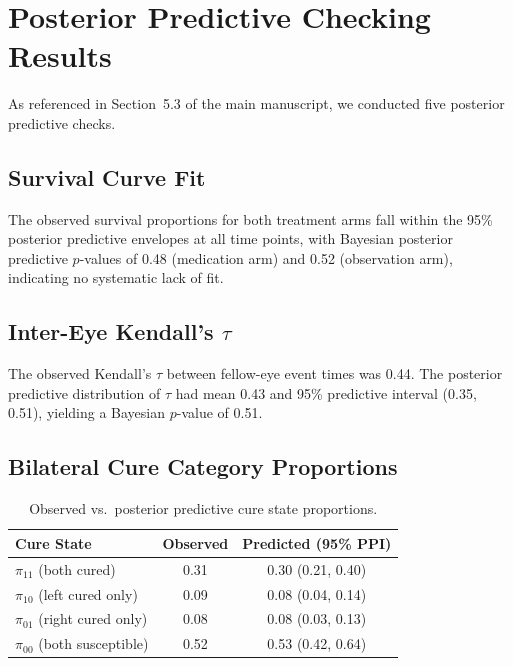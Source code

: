 \documentclass[12pt,a4paper]{article}
\begin{document}
\section{Posterior Predictive Checking Results}
\label{sec:S11}

As referenced in Section~5.3 of the main manuscript, we conducted five posterior predictive checks.

\subsection{Survival Curve Fit}

The observed survival proportions for both treatment arms fall within the 95\% posterior predictive envelopes at all time points, with Bayesian posterior predictive $p$-values of 0.48 (medication arm) and 0.52 (observation arm), indicating no systematic lack of fit.

\subsection{Inter-Eye Kendall's $\tau$}

The observed Kendall's $\tau$ between fellow-eye event times was 0.44. The posterior predictive distribution of $\tau$ had mean 0.43 and 95\% predictive interval (0.35, 0.51), yielding a Bayesian $p$-value of 0.51.

\subsection{Bilateral Cure Category Proportions}

\begin{table}[H]
\centering
\caption{Observed vs.\ posterior predictive cure state proportions.}
\label{tab:S11}
\begin{tabular}{lcc}
\toprule
\textbf{Cure State} & \textbf{Observed} & \textbf{Predicted (95\% PPI)} \\
\midrule
$\pi_{11}$ (both cured) & 0.31 & 0.30 (0.21, 0.40) \\
$\pi_{10}$ (left cured only) & 0.09 & 0.08 (0.04, 0.14) \\
$\pi_{01}$ (right cured only) & 0.08 & 0.08 (0.03, 0.13) \\
$\pi_{00}$ (both susceptible) & 0.52 & 0.53 (0.42, 0.64) \\
\bottomrule
\end{tabular}
\end{table}
\end{document}
